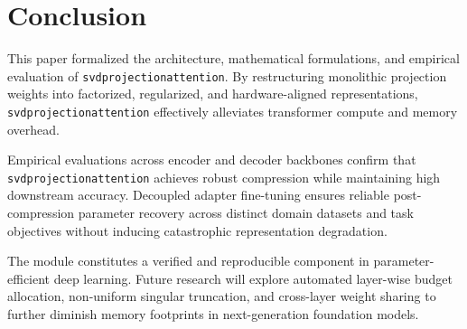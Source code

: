 \section{Conclusion}
This paper formalized the architecture, mathematical formulations, and empirical evaluation of \texttt{svdprojectionattention}. By restructuring monolithic projection weights into factorized, regularized, and hardware-aligned representations, \texttt{svdprojectionattention} effectively alleviates transformer compute and memory overhead.

Empirical evaluations across encoder and decoder backbones confirm that \texttt{svdprojectionattention} achieves robust compression while maintaining high downstream accuracy. Decoupled adapter fine-tuning ensures reliable post-compression parameter recovery across distinct domain datasets and task objectives without inducing catastrophic representation degradation.

The module constitutes a verified and reproducible component in parameter-efficient deep learning. Future research will explore automated layer-wise budget allocation, non-uniform singular truncation, and cross-layer weight sharing to further diminish memory footprints in next-generation foundation models.
